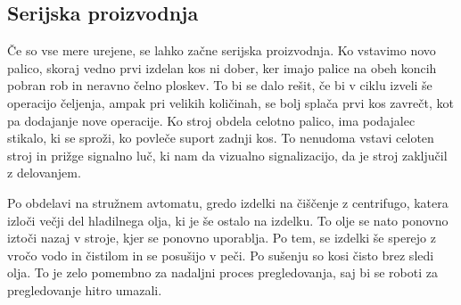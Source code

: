 \subsection{Serijska proizvodnja}
Če so vse mere urejene, se lahko začne serijska proizvodnja.
Ko vstavimo novo palico, skoraj vedno prvi izdelan kos ni dober,
ker imajo palice na obeh koncih pobran rob in neravno čelno ploskev.
To bi se dalo rešit, če bi v ciklu izveli še operacijo čeljenja,
ampak pri velikih količinah, se bolj splača prvi kos zavrečt,
kot pa dodajanje nove operacije. Ko stroj obdela celotno palico,
ima podajalec stikalo, ki se sproži, ko povleče suport zadnji
kos. To nenudoma vstavi celoten stroj in prižge signalno luč,
ki nam da vizualno signalizacijo, da je stroj zaključil z delovanjem.

Po obdelavi na stružnem avtomatu, gredo izdelki na čiščenje z centrifugo,
katera izloči večji del hladilnega olja, ki je še ostalo na izdelku.
To olje se nato ponovno iztoči nazaj v stroje, kjer se ponovno uporablja.
Po tem, se izdelki še sperejo z vročo vodo in čistilom in se posušijo
v peči. Po sušenju so kosi čisto brez sledi olja. To je zelo pomembno
za nadaljni proces pregledovanja, saj bi se roboti za pregledovanje
hitro umazali.